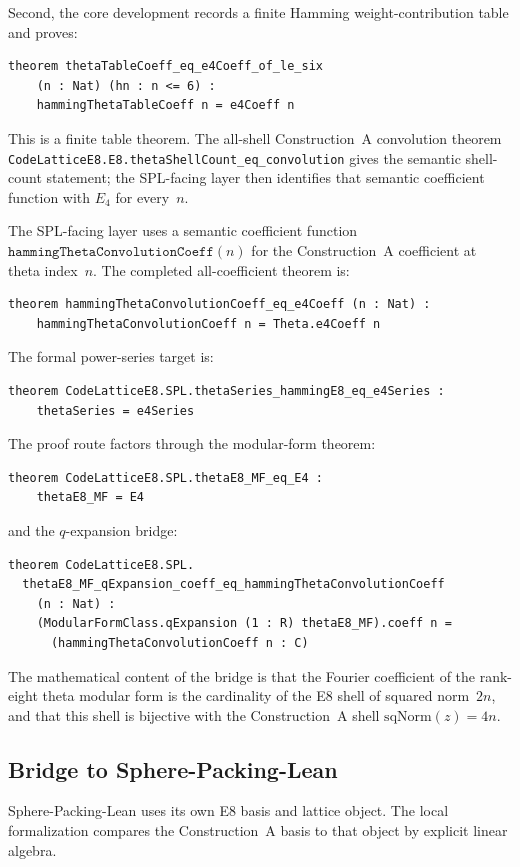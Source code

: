 \documentclass[12pt]{article}
\theoremstyle{definition}
\newcommand{\code}[1]{\texttt{#1}}
\newcommand{\lean}[1]{\texttt{#1}}
\begin{document}
Second, the core development records a finite Hamming weight-contribution table and
proves:
\begin{lstlisting}[style=lean]
theorem thetaTableCoeff_eq_e4Coeff_of_le_six
    (n : Nat) (hn : n <= 6) :
    hammingThetaTableCoeff n = e4Coeff n
\end{lstlisting}
This is a finite table theorem.  The all-shell Construction~A convolution
theorem \lean{CodeLatticeE8.E8.thetaShellCount\_eq\_convolution} gives the
semantic shell-count statement; the SPL-facing layer then identifies that
semantic coefficient function with $E_4$ for every~$n$.

The SPL-facing layer uses a semantic coefficient function
$\code{hammingThetaConvolutionCoeff}(n)$ for the Construction~A coefficient at
theta index~$n$.  The completed all-coefficient theorem is:
\begin{lstlisting}[style=lean]
theorem hammingThetaConvolutionCoeff_eq_e4Coeff (n : Nat) :
    hammingThetaConvolutionCoeff n = Theta.e4Coeff n
\end{lstlisting}
The formal power-series target is:
\begin{lstlisting}[style=lean]
theorem CodeLatticeE8.SPL.thetaSeries_hammingE8_eq_e4Series :
    thetaSeries = e4Series
\end{lstlisting}
The proof route factors through the modular-form theorem:
\begin{lstlisting}[style=lean]
theorem CodeLatticeE8.SPL.thetaE8_MF_eq_E4 :
    thetaE8_MF = E4
\end{lstlisting}
and the $q$-expansion bridge:
\begin{lstlisting}[style=lean]
theorem CodeLatticeE8.SPL.
  thetaE8_MF_qExpansion_coeff_eq_hammingThetaConvolutionCoeff
    (n : Nat) :
    (ModularFormClass.qExpansion (1 : R) thetaE8_MF).coeff n =
      (hammingThetaConvolutionCoeff n : C)
\end{lstlisting}
The mathematical content of the bridge is that the Fourier coefficient of the
rank-eight theta modular form is the cardinality of the E8 shell of squared
norm~$2n$, and that this shell is bijective with the Construction~A shell
$\mathrm{sqNorm}(z) = 4n$.

\subsection{Bridge to Sphere-Packing-Lean}

Sphere-Packing-Lean uses its own E8 basis and lattice object.  The local
formalization compares the Construction~A basis to that object by explicit
linear algebra.
\end{document}

